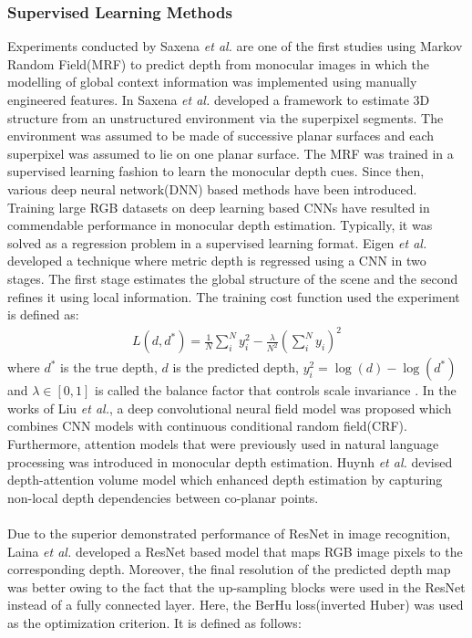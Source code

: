 \subsubsection*{Supervised Learning Methods}
\label{sec:related:sec3:subsec1:part1}
Experiments conducted by Saxena \textit{et al.}\cite{saxena2005learning} are one of the first studies using Markov Random Field(MRF) to predict depth from monocular images in which the modelling of global context information was implemented using manually
engineered features. In \cite{4408828} Saxena \textit{et al.} developed a framework to estimate 3D structure from an unstructured environment via the superpixel segments. The environment was assumed to be made of successive planar surfaces and each superpixel was assumed to lie on one planar surface. The MRF was trained in a supervised learning fashion to learn the monocular depth cues. Since then, various deep neural network(DNN) based methods have been introduced.\\
Training large RGB datasets on deep learning based CNNs have resulted in commendable performance in monocular depth estimation. Typically, it was solved as a regression problem in a supervised learning format. Eigen \textit{et al.} \cite{eigen2014depth} developed a technique where metric depth is regressed using a CNN in two stages. The first stage estimates the global structure of the scene and the second refines it using local information. The training cost function used the experiment is defined as:
\begin{align*}
	L(d,d^*) = \frac{1}{N} \sum_{i}^{N} y_i^2 - \frac{\lambda}{N^2} \left( \sum_{i}^{N}y_i\right)^2 
\end{align*}
where $ d^{*} $ is the true depth, $ d $ is the predicted depth, $ y_{i}^2 = \log(d) - \log(d^{*}) $ and $ \lambda \in [0,1]$ is called the balance factor that controls scale invariance \cite{eigen2014depth}.
In the works of Liu \textit{et al.}\cite{liu2015learning}, a deep convolutional neural field model was proposed which combines CNN models with continuous conditional random field(CRF). Furthermore, attention models that were previously used in natural language processing was introduced in monocular depth estimation. Huynh \textit{et al.}\cite{attention} devised depth-attention volume model which enhanced depth estimation by capturing non-local depth dependencies between co-planar points.\\\\
Due to the superior demonstrated performance of ResNet \cite{7780459} in image recognition, Laina \textit{et al.} \cite{laina2016deeper} developed a ResNet based model that maps RGB image pixels to the corresponding depth. Moreover, the final resolution of the predicted depth map was better owing to the fact that the up-sampling blocks were used in the ResNet instead of a fully connected layer. Here, the BerHu loss(inverted Huber) was used as the optimization criterion. It is defined as follows:
